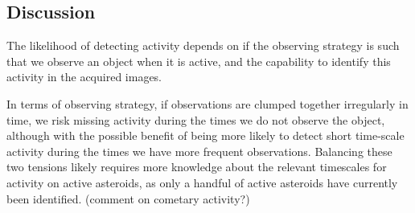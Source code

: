 
\subsection{Discussion}
\label{sec:\secname:discussion}

The likelihood of detecting activity depends on if the observing
strategy is such that we observe an object when it is active, and the
capability to identify this activity in the acquired images.

In terms of observing strategy, if observations are clumped together
irregularly in time, we risk missing activity during the times we do
not observe the object, although with the possible benefit of being
more likely to detect short time-scale activity during the times we
have more frequent observations. Balancing these two tensions likely
requires more knowledge about the relevant timescales for activity on
active asteroids, as only a handful of active asteroids have currently
been identified. (comment on cometary activity?)


\navigationbar
